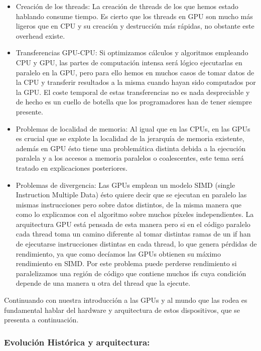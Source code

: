 \begin{itemize}
\item Creación de los threads: La creación de threads de los que hemos estado hablando consume tiempo. Es cierto que los threads en GPU son mucho más ligeros que en CPU y su creación y destrucción más rápidas, no obstante este overhead existe.

\item Transferencias GPU-CPU: Si optimizamos cálculos y algoritmos empleando CPU y GPU, las partes de computación intensa será lógico ejecutarlas en paralelo en la GPU, pero para ello hemos en muchos casos de tomar datos de la CPU y transferir resultados a la misma cuando hayan sido computados por la GPU. El coste temporal de estas transferencias no es nada despreciable y de hecho es un cuello de botella que los programadores han de tener siempre presente.

\item Problemas de localidad de memoria: Al igual que en las CPUs, en las GPUs es crucial que se explote la localidad de la jerarquía de memoria existente, además en GPU ésto tiene una problemática distinta debida a la ejecución paralela y a los accesos a memoria paralelos o coalescentes, este tema será tratado en explicaciones posteriores.

\item Problemas de divergencia: Las GPUs emplean un modelo SIMD (single Instruction Multiple Data) ésto quiere decir que se ejecutan en paralelo las mismas instrucciones pero sobre datos distintos, de la misma manera que como lo explicamos con el algoritmo sobre muchos píxeles independientes. La arquitectura GPU está pensada de esta manera pero si en el código paralelo cada thread toma un camino diferente al tomar distintas ramas de un if han de ejecutarse instrucciones distintas en cada thread, lo que genera pérdidas de rendimiento, ya que como decíamos las GPUs obtienen su máximo rendimiento en SIMD. Por este problema puede perderse rendimiento si paralelizamos una región de código que contiene muchos ifs cuya condición depende de una manera u otra del thread que la ejecute.

\end{itemize}

Continuando con nuestra introducción a las GPUs y al mundo que las rodea es fundamental hablar del hardware y arquitectura de estos dispositivos, que se presenta a continuación.

\subsubsection*{Evolución Histórica y arquitectura:}

